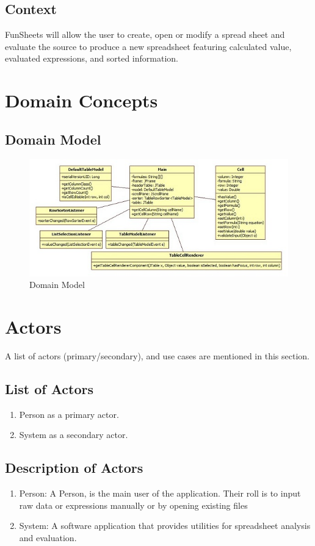 \documentclass[12pt]{article}
\begin{document}
\subsection{Context}
FunSheets will allow the user to create, open or modify a spread sheet and evaluate the source to produce a new spreadsheet featuring calculated value, evaluated expressions, and sorted information.

\section{Domain Concepts}
\subsection{Domain Model}

\begin{figure}[htbp]
\includegraphics{DomainModel.jpg}
\caption{Domain Model}
\label{fig:Domain-model-diagram}
\end{figure}

\clearpage

\section{Actors}
A list of actors (primary/secondary), and use cases are mentioned in this section.

\subsection{List of Actors}
\begin{enumerate}
\item Person as a primary actor.
\item System as a secondary actor.
\end{enumerate}

\subsection{Description of Actors}
\begin{enumerate}
\item Person:  A Person, is the main user of the application. Their roll is to input raw data or expressions manually or by opening existing files
\item System:  A software application that provides utilities for spreadsheet analysis and evaluation.
\end{enumerate}
\end{document}
